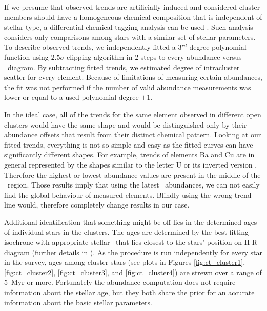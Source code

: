 If we presume that observed trends are artificially induced and considered cluster members should have a homogeneous chemical composition that is independent of stellar type, a differential chemical tagging analysis can be used \cite{2019arXiv191208539C}. Such analysis considers only comparisons among stars with a similar set of stellar parameters. To describe observed trends, we independently fitted a 3$^{rd}$ degree polynomial function using $2.5\sigma$ clipping algorithm in 2 steps to every abundance versus \Teff\ diagram. By subtracting fitted trends, we estimated degree of intracluster scatter for every element. Because of limitations of measuring certain abundances, the fit was not performed if the number of valid abundance measurements was lower or equal to a used polynomial degree $+1$.

In the ideal case, all of the trends for the same element observed in different open clusters would have the same shape and would be distinguished only by their abundance offsets that result from their distinct chemical pattern. Looking at our fitted trends, everything is not so simple and easy as the fitted curves can have significantly different shapes. For example, trends of elements Ba and Cu are in general represented by the shapes similar to the letter U or its inverted version \rotU. Therefore the highest or lowest abundance values are present in the middle of the \Teff\ region. Those results imply that using the latest \Gh\ abundances, we can not easily find the global behaviour of measured elements. Blindly using the wrong trend line would, therefore completely change results in our case.

Additional identification that something might be off lies in the determined ages of individual stars in the clusters. The ages are determined by the best fitting isochrone with appropriate stellar \Feh\ that lies closest to the stars' position on H-R diagram (further details in \citet{buder2020}). As the procedure is run independently for every star in the survey, ages among cluster stars (see plots in Figures \ref{fig:ct_cluster1}, \ref{fig:ct_cluster2}, \ref{fig:ct_cluster3}, and \ref{fig:ct_cluster4}) are strewn over a range of 5~Myr or more. Fortunately the abundance computation does not require information about the stellar age, but they both share the prior for an accurate information about the basic stellar parameters.


